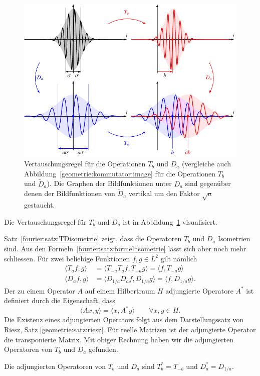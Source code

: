 \begin{figure}
\centering
\includegraphics{chapters/2-fourier/images/kommutatorD.pdf}
\caption{Vertauschungsregel für die Operationen $T_b$ und $D_a$
(vergleiche auch Abbildung~\ref{geometrie:kommutator:image} für
die Operationen $T_b$ und $\tilde{D}_a$).
Die Graphen der Bildfunktionen unter $D_a$ sind gegenüber denen der
Bildfunktionen von $\tilde{D}_a$ vertikal um den Faktor $\sqrt{a}$
gestaucht.
\label{geometrie:kommutatorD:image}}
\end{figure}

Die Vertauschungsregel für $T_b$ und $D_a$ ist in
Abbildung~\ref{geometrie:kommutatorD:image} visualisiert.
%

Satz~\ref{fourier:satz:TDisometrie} zeigt, dass die Operatoren $T_b$
und $D_a$ Isometrien sind.
Aus den Formeln~\eqref{fourier:satz:formel:isometrie} lässt sich aber
noch mehr schliessen.
Für zwei beliebige Funktionen $f,g\in L^2$ gilt nämlich
\begin{align*}
\langle T_af,g\rangle
&=
\langle T_{-a}T_af,T_{-a}g\rangle
=
\langle f,T_{-a}g\rangle
\\
\langle D_af,g\rangle
&=
\langle D_{1/a}D_af,D_{1/a}g\rangle
=
\langle f,D_{1/a}g\rangle.
\end{align*}
Der zu einem Operator $A$ auf einem Hilbertraum $H$ adjungierte Operatore
%
$A^*$ ist definiert durch die Eigenschaft, dass
\[
\langle Ax,y\rangle = \langle x,A^*y\rangle
\qquad
\forall x,y\in H.
\]
Die Existenz eines adjungierten Operators folgt aus dem Darstellungssatz
von Riesz, Satz \ref{geometrie:satz:riesz}.
Für reelle Matrizen ist der adjungierte Operator die transponierte Matrix.
Mit obiger Rechnung haben wir die adjungierten Operatoren von $T_b$ und $D_a$
gefunden.

\begin{satz}
\label{fourier:satz:adjungierte}
Die adjungierten Operatoren von $T_b$ und $D_a$ sind
$T_b^* = T_{-b}$ und $D_a^*=D_{1/a}$.
\end{satz}



